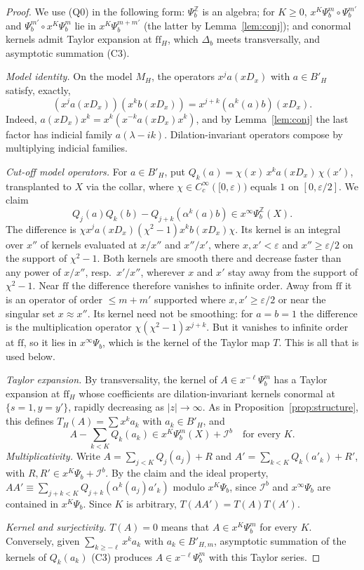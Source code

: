 \documentclass[11pt,oneside,reqno]{article}
\newcommand{\Z}{\mathbb Z}
\newcommand{\Ib}{\mathcal I^b}
\theoremstyle{plain}
\theoremstyle{definition}
\theoremstyle{remark}
\begin{document}
\begin{proof}
We use (Q0) in the following form: \(\Psi_b^{\Z}\) is an algebra; for
\(K\geq0\), \(x^K\Psi_b^m\circ\Psi_b^{m'}\) and
\(\Psi_b^{m'}\circ x^K\Psi_b^m\) lie in \(x^K\Psi_b^{m+m'}\) (the latter by
Lemma~\ref{lem:conj}); and conormal kernels admit Taylor expansion at
\(\mathrm{ff}_H\), which \(\Delta_b\) meets transversally, and asymptotic
summation (C3).

\emph{Model identity.} On the model \(M_H\), the operators
\(x^ja(xD_x)\) with \(a\in B'_H\) satisfy, exactly,
\[
 (x^ja(xD_x))(x^kb(xD_x))=x^{j+k}(\alpha^k(a)b)(xD_x).
\]
Indeed,
\(a(xD_x)x^k=x^k(x^{-k}a(xD_x)x^k)\), and by Lemma~\ref{lem:conj} the last
factor has indicial family \(a(\lambda-ik)\). Dilation-invariant operators
compose by multiplying indicial families.

\emph{Cut-off model operators.} For \(a\in B'_H\), put
\(Q_k(a)=\chi(x)\,x^ka(xD_x)\,\chi(x')\), transplanted to \(X\) via the
collar, where \(\chi\in C_c^\infty([0,\varepsilon))\) equals \(1\) on
\([0,\varepsilon/2]\). We claim
\[
 Q_j(a)Q_k(b)-Q_{j+k}(\alpha^k(a)b)\in x^\infty\Psi_b^{\Z}(X) .
\]
The difference is \(\chi x^ja(xD_x)(\chi^2-1)x^kb(xD_x)\chi\). Its kernel is
an integral over \(x''\) of kernels evaluated at \(x/x''\) and
\(x''/x'\), where \(x,x'<\varepsilon\) and \(x''\geq\varepsilon/2\) on the
support of \(\chi^2-1\). Both kernels are smooth there and decrease faster
than any power of \(x/x''\), resp.\ \(x'/x''\), wherever \(x\) and
\(x'\) stay away from the support of \(\chi^2-1\). Near \(\mathrm{ff}\) the
difference therefore vanishes to infinite order. Away from \(\mathrm{ff}\)
it is an operator of order \(\leq m+m'\) supported where
\(x,x'\geq\varepsilon/2\) or near the singular set \(x\approx x''\). Its
kernel need not be smoothing: for \(a=b=1\) the difference is the
multiplication operator \(\chi(\chi^2-1)x^{j+k}\). But it vanishes to
infinite order at \(\mathrm{ff}\), so it lies in \(x^\infty\Psi_b\), which is
the kernel of the Taylor map \(T\). This is all that is used below.

\emph{Taylor expansion.} By transversality, the kernel of
\(A\in x^{-\ell}\Psi_b^m\) has a Taylor expansion at \(\mathrm{ff}_H\) whose
coefficients are dilation-invariant kernels conormal at \(\{s=1,y=y'\}\),
rapidly decreasing as \(|z|\to\infty\). As in
Proposition~\ref{prop:structure}, this defines
\(T_H(A)=\sum x^ka_k\) with \(a_k\in B'_H\), and
\[
 A-\sum_{k<K}Q_k(a_k)\in x^{K}\Psi_b^m(X)+\Ib\quad\text{for every }K .
\]
\emph{Multiplicativity.} Write \(A=\sum_{j<K}Q_j(a_j)+R\) and
\(A'=\sum_{k<K}Q_k(a'_k)+R'\), with \(R,R'\in x^{K}\Psi_b+\Ib\). By the
claim and the ideal property, \(AA'\equiv\sum_{j+k<K}Q_{j+k}(\alpha^k(a_j)
a'_k)\) modulo \(x^{K}\Psi_b\), since \(\Ib\) and \(x^\infty\Psi_b\) are
contained in \(x^K\Psi_b\). Since \(K\) is arbitrary,
\(T(AA')=T(A)T(A')\).

\emph{Kernel and surjectivity.} \(T(A)=0\) means that \(A\in x^K\Psi_b^m\) for
every \(K\). Conversely, given \(\sum_{k\geq-\ell}x^ka_k\) with
\(a_k\in B'_{H,m}\), asymptotic summation of the kernels of \(Q_k(a_k)\)
(C3) produces \(A\in x^{-\ell}\Psi_b^m\) with this Taylor series.
\end{proof}
\end{document}
